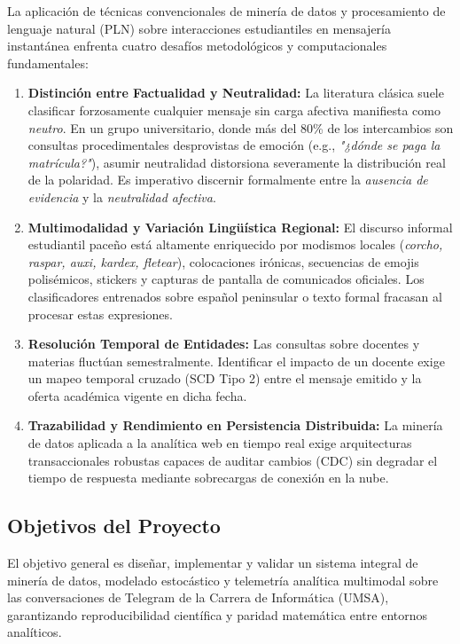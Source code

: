 La aplicación de técnicas convencionales de minería de datos y procesamiento de lenguaje natural (PLN) sobre interacciones estudiantiles en mensajería instantánea enfrenta cuatro desafíos metodológicos y computacionales fundamentales:
\begin{enumerate}
  \item \textbf{Distinción entre Factualidad y Neutralidad:} La literatura clásica suele clasificar forzosamente cualquier mensaje sin carga afectiva manifiesta como \emph{neutro}. En un grupo universitario, donde más del 80\% de los intercambios son consultas procedimentales desprovistas de emoción (e.g., \emph{"¿dónde se paga la matrícula?"}), asumir neutralidad distorsiona severamente la distribución real de la polaridad. Es imperativo discernir formalmente entre la \emph{ausencia de evidencia} y la \emph{neutralidad afectiva}.
  \item \textbf{Multimodalidad y Variación Lingüística Regional:} El discurso informal estudiantil paceño está altamente enriquecido por modismos locales (\emph{corcho, raspar, auxi, kardex, fletear}), colocaciones irónicas, secuencias de emojis polisémicos, stickers y capturas de pantalla de comunicados oficiales. Los clasificadores entrenados sobre español peninsular o texto formal fracasan al procesar estas expresiones.
  \item \textbf{Resolución Temporal de Entidades:} Las consultas sobre docentes y materias fluctúan semestralmente. Identificar el impacto de un docente exige un mapeo temporal cruzado (SCD Tipo 2) entre el mensaje emitido y la oferta académica vigente en dicha fecha.
  \item \textbf{Trazabilidad y Rendimiento en Persistencia Distribuida:} La minería de datos aplicada a la analítica web en tiempo real exige arquitecturas transaccionales robustas capaces de auditar cambios (CDC) sin degradar el tiempo de respuesta mediante sobrecargas de conexión en la nube.
\end{enumerate}

\subsection{Objetivos del Proyecto}

El objetivo general es diseñar, implementar y validar un sistema integral de minería de datos, modelado estocástico y telemetría analítica multimodal sobre las conversaciones de Telegram de la Carrera de Informática (UMSA), garantizando reproducibilidad científica y paridad matemática entre entornos analíticos.


